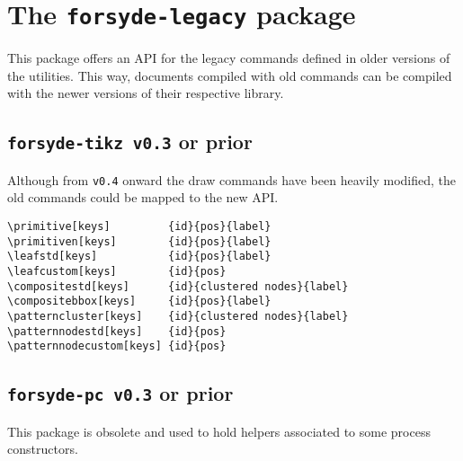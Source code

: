 \section{The \texttt{forsyde-legacy} package}
\label{sec:legacy-package}

This package offers an API for the legacy commands defined in older versions of the \ForSyDeLaTeX utilities. This way, documents compiled with old commands can be compiled with the newer versions of their respective library.

\subsection{\texttt{forsyde-tikz v0.3} or prior}
\label{sec:forsyde-tikz-v0.3}

Although from \texttt{v0.4} onward the draw commands have been heavily modified, the old commands could be mapped to the new API.

\begin{lstlisting}
\primitive[keys]         {id}{pos}{label}
\primitiven[keys]        {id}{pos}{label}
\leafstd[keys]           {id}{pos}{label}
\leafcustom[keys]        {id}{pos}
\compositestd[keys]      {id}{clustered nodes}{label}
\compositebbox[keys]     {id}{pos}{label}
\patterncluster[keys]    {id}{clustered nodes}{label}
\patternnodestd[keys]    {id}{pos}
\patternnodecustom[keys] {id}{pos}
\end{lstlisting}

\subsection{\texttt{forsyde-pc v0.3} or prior}
\label{sec:forsyde-pc-v0.3}

This package is obsolete and used to hold helpers associated to some \ForSyDe process constructors.

